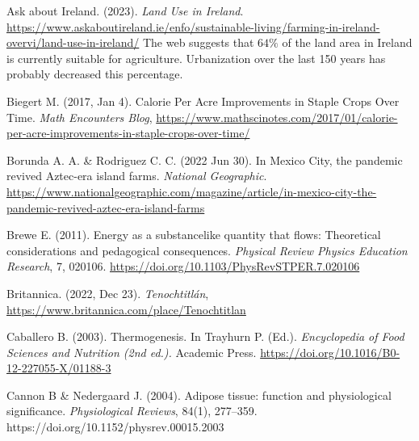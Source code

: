 \documentclass[man]{apa7}
\begin{document}
\begin{thebibliography}{99}

Ask about Ireland.
(2023).
\textit{Land Use in Ireland}.
\url{https://www.askaboutireland.ie/enfo/sustainable-living/farming-in-ireland-overvi/land-use-in-ireland/}
The web suggests that $64\%$ of the land area in Ireland is currently suitable for agriculture.  Urbanization over the last 150 years has probably decreased this percentage.  


Biegert M.
(2017, Jan 4).
Calorie Per Acre Improvements in Staple Crops Over Time.
\textit{Math Encounters Blog},
\url{https://www.mathscinotes.com/2017/01/calorie-per-acre-improvements-in-staple-crops-over-time/}

Borunda A. A. \& Rodriguez C. C.
(2022 Jun 30).
In Mexico City, the pandemic revived Aztec-era island farms.
\textit{National Geographic}.
\url{https://www.nationalgeographic.com/magazine/article/in-mexico-city-the-pandemic-revived-aztec-era-island-farms}

Brewe E.
(2011).
Energy as a substancelike quantity that flows: Theoretical considerations
and pedagogical consequences.
\textit{Physical Review Physics Education Research},
7, 020106.
\url{https://doi.org/10.1103/PhysRevSTPER.7.020106}

Britannica.
(2022, Dec 23).
\textit{Tenochtitlán},
\url{https://www.britannica.com/place/Tenochtitlan}

Caballero B. 
(2003). 
Thermogenesis.
In Trayhurn P. (Ed.). 
\textit{Encyclopedia of Food Sciences and Nutrition (2nd ed.).}
Academic Press.
\url{https://doi.org/10.1016/B0-12-227055-X/01188-3}

Cannon B \& Nedergaard J. 
(2004).
Adipose tissue: function and physiological significance.
\textit{Physiological Reviews}, 
84(1), 
277--359.
https://doi.org/10.1152/physrev.00015.2003


\end{thebibliography}
\end{document}
